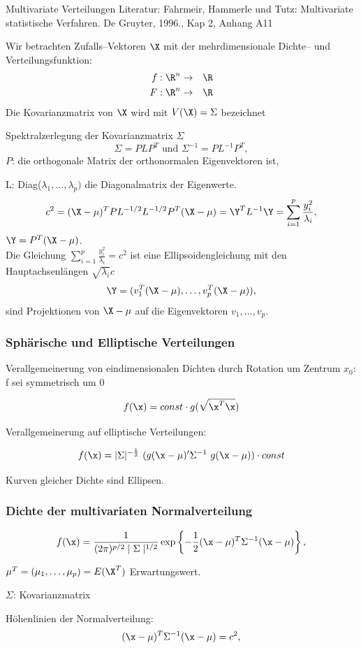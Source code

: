 
\begin{frame}{Multivariate Verteilungen}
Literatur:  Fahrmeir, Hammerle und Tutz: Multivariate statistische Verfahren. De Gruyter, 1996., Kap 2,  Anhang A11 
\vspace{1cm}

Wir betrachten Zufalls--Vektoren $\X$   mit der mehrdimensionale Dichte-- und Verteilungsfunktion:  
\begin{eqnarray*}
f: \R^n &\rightarrow & \R   \\
F:  \R^n &\rightarrow & \R   
\end{eqnarray*}
Die Kovarianzmatrix von $\X$ wird mit $ V(\X) = \Sigma$ bezeichnet  

\end{frame}

\begin{frame}{Spektralzerlegung der Kovarianzmatrix $\Sigma$}
\[
\Sigma = P L P^T\text{\ \ und\ \ }\Sigma^{-1} = P L^{-1}P^T,
\]
$P$: die orthogonale Matrix der orthonormalen Eigenvektoren ist,

L: Diag($\lambda_1,\ldots,\lambda_p)$ die Diagonalmatrix der
Eigenwerte.
\[
c^2 = (\X - \mu)^T P L^{-1/2} L^{-1/2}P^T(\X-\mu) = \Y^T L^{-1}\Y =
\sum^p_{i=1}\frac{y^2_i}{\lambda_i},
\]
$\Y = P^T(\X-\mu)$.\\

Die Gleichung $\sum^p_{i=1}\frac{y_i^2}{\lambda_i} = c^2$ ist eine
Ellipsoidengleichung mit den Hauptachsenl\"{a}ngen
$\sqrt{\lambda_i}c$
\[
\Y = (v^T_1(\X - \mu),\ldots,v_p^T(\X-\mu)),
\]
sind Projektionen von $\X-\mu$ auf die Eigenvektoren
$v_1,\ldots,v_p$.
\end{frame}


\begin{frame}\frametitle{Sph\"{a}rische und  Elliptische Verteilungen}
 Verallgemeinerung von eindimensionalen Dichten durch
Rotation um Zentrum $x_0$: \\ f sei symmetrisch um 0

\[
f(\x)=const \cdot g(\sqrt{\x^T \x})
\]

Verallgemeinerung auf elliptische Verteilungen:

\[
f(\x)=|\Sigma|^{-\frac{1}{2}}\,\,(g(\x-\mu)'\Sigma^{-1}\,\,g(\x-\mu)) \cdot const
\]

Kurven gleicher Dichte sind Ellipsen.
\end{frame}

\begin{frame}\frametitle{Dichte der multivariaten Normalverteilung}
\[
f(\x)=\frac{1}{(2\pi)^{p/2}\mid\Sigma\mid^{1/2}}
\exp\left\{-\frac{1}{2}(\x-\mu)^T\Sigma^{-1}(\x-\mu)\right\},
\]

$\mu^T = (\mu_1,\ldots,\mu_p)  = E(\X^T)$ Erwartungswert.

$\Sigma$: Kovarianzmatrix \vspace{0.5cm}

H\"{o}henlinien der Normalverteilung:
\[
(\x - \mu)^T\Sigma^{-1}(\x-\mu) = c^2,
\]
\end{frame}

